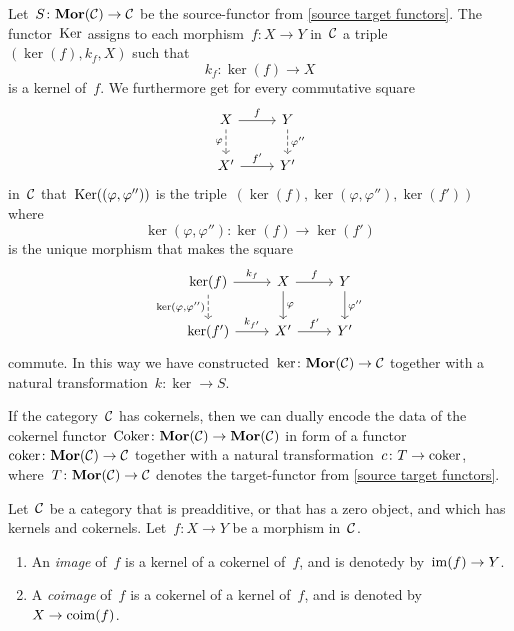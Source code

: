 \begin{remark*}
\begin{enumerate}
      Let~$S \colon \mathbf{Mor}(\mathcal{C}) \to \mathcal{C}$ be the source-functor from \cref{source target functors}.
      The functor~$\operatorname{Ker}$ assigns to each morphism~$f \colon X \to Y$ in~$\mathcal{C}$ a triple~$(\ker(f), k_f, X)$ such that
      \[
                k_f
        \colon  \ker(f)
        \to     X
      \]
      is a kernel of~$f$.
      We furthermore get for every commutative square
      \[
        \begin{tikzcd}
            X
            \arrow{r}[above]{f}
            \arrow[dashed]{d}[left]{\varphi}
          & Y
            \arrow[dashed]{d}[right]{\varphi''}
          \\
            X'
            \arrow{r}[above]{f'}
          & Y'
        \end{tikzcd}
      \]
      in~$\mathcal{C}$ that~$\operatorname{Ker}((\varphi,\varphi''))$ is the triple~$(\ker(f), \ker(\varphi,\varphi''), \ker(f'))$ where
      \[
                \ker(\varphi, \varphi'')
        \colon  \ker(f)
        \to     \ker(f')
      \]
      is the unique morphism that makes the square
      \[
        \begin{tikzcd}
            \ker(f)
            \arrow{r}[above]{k_f}
            \arrow[dashed]{d}[left]{\ker(\varphi, \varphi'')}
          & X
            \arrow{r}[above]{f}
            \arrow{d}[right]{\varphi}
          & Y
            \arrow{d}[right]{\varphi''}
          \\
            \ker(f')
            \arrow{r}[above]{k_{f'}}
          & X'
            \arrow{r}[above]{f'}
          & Y'
        \end{tikzcd}
      \]
      commute.
      In this way we have constructed~$\ker \colon \mathbf{Mor}(\mathcal{C}) \to \mathcal{C}$ together with a natural transformation~$k \colon \ker \to S$.
      
      If the category~$\mathcal{C}$ has cokernels, then we can dually encode the data of the cokernel functor~$\operatorname{Coker} \colon \mathbf{Mor}(\mathcal{C}) \to \mathbf{Mor}(\mathcal{C})$ in form of a functor~$\operatorname{coker} \colon \mathbf{Mor}(\mathcal{C}) \to \mathcal{C}$ together with a natural transformation~$c \colon T \to \operatorname{coker}$, where~$T \colon \mathbf{Mor}(\mathcal{C}) \to \mathcal{C}$ denotes the target-functor from \cref{source target functors}.
  \end{enumerate}
\end{remark*}


\begin{definition}
  Let~$\mathcal{C}$ be a category that is preadditive, or that has a zero object, and which has kernels and cokernels.
  Let~$f \colon X \to Y$ be a morphism in~$\mathcal{C}$.
  \begin{enumerate}
    \item
      An \emph{image} of~$f$ is a kernel of a cokernel of~$f$, and is denotedy by~$\operatorname{im}(f) \to Y$.
    \item
      A \emph{coimage} of~$f$ is a cokernel of a kernel of~$f$, and is denoted by~$X \to \operatorname{coim}(f)$.
  \end{enumerate}
\end{definition}


